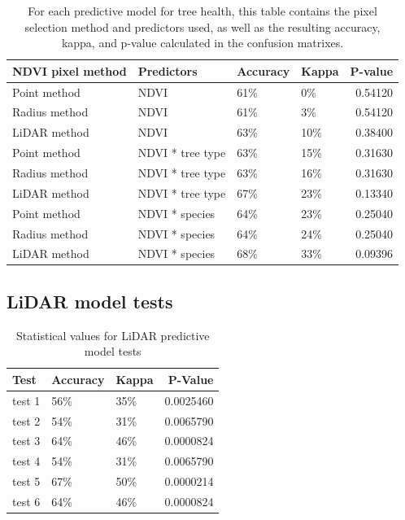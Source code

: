 \documentclass[12pt,twoside]{reedthesis}
\begin{document}
\begin{longtable}[t]{llllr}
\caption[Summary of results from various predictive models]{\label{tab:model-table}For each predictive model for tree health, this table contains the pixel selection method and predictors used, as well as the resulting accuracy, kappa, and p-value calculated in the confusion matrixes.}\\
\toprule
NDVI pixel method & Predictors & Accuracy & Kappa & P-value\\
\midrule
Point method & NDVI & 61\% & 0\% & 0.54120\\
Radius method & NDVI & 61\% & 3\% & 0.54120\\
LiDAR method & NDVI & 63\% & 10\% & 0.38400\\
Point method & NDVI * tree type & 63\% & 15\% & 0.31630\\
Radius method & NDVI * tree type & 63\% & 16\% & 0.31630\\
\addlinespace
LiDAR method & NDVI * tree type & 67\% & 23\% & 0.13340\\
Point method & NDVI * species & 64\% & 23\% & 0.25040\\
Radius method & NDVI * species & 64\% & 24\% & 0.25040\\
LiDAR method & NDVI * species & 68\% & 33\% & 0.09396\\
\bottomrule
\end{longtable}
\hypertarget{lidar-model-tests-1}{%
\subsection*{LiDAR model tests}\label{lidar-model-tests-1}}
\begin{table}

\caption{\label{tab:model-test-table}Statistical values for LiDAR predictive model tests}
\centering
\begin{tabular}[t]{lllr}
\toprule
Test & Accuracy & Kappa & P-Value\\
\midrule
test 1 & 56\% & 35\% & 0.0025460\\
test 2 & 54\% & 31\% & 0.0065790\\
test 3 & 64\% & 46\% & 0.0000824\\
test 4 & 54\% & 31\% & 0.0065790\\
test 5 & 67\% & 50\% & 0.0000214\\
\addlinespace
test 6 & 64\% & 46\% & 0.0000824\\
\bottomrule
\end{tabular}
\end{table}
\end{document}
